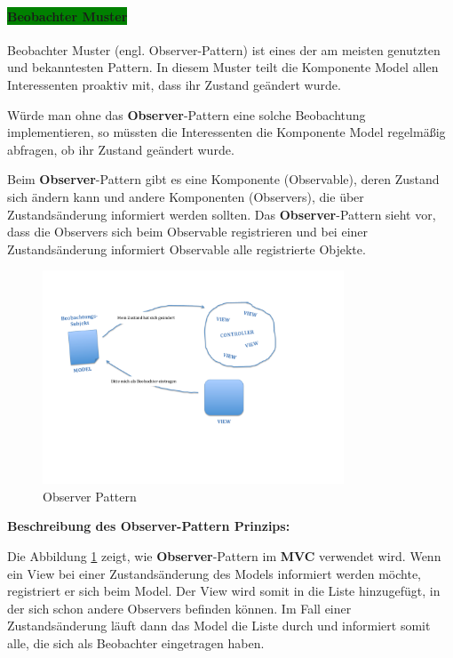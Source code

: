 \paragraph{\colorbox{green}{Beobachter Muster}}\label{observer}

Beobachter Muster (engl. Observer-Pattern) ist eines der am meisten genutzten und bekanntesten Pattern. In diesem Muster teilt die Komponente Model allen Interessenten proaktiv mit, dass ihr Zustand geändert wurde.

Würde man ohne das \textbf{Observer}-Pattern eine solche Beobachtung implementieren, so müssten die Interessenten die Komponente Model regelmäßig abfragen, ob ihr Zustand geändert wurde.

Beim \textbf{Observer}-Pattern gibt es eine Komponente (Observable), deren Zustand sich ändern kann und andere Komponenten (Observers), die über Zustandsänderung informiert werden sollten. Das \textbf{Observer}-Pattern sieht vor, dass die Observers sich beim Observable registrieren und bei einer Zustandsänderung informiert Observable alle registrierte Objekte.

\begin{figure}[H]
\centering
\includegraphics[trim = 0mm 0mm 0mm 0mm, clip, width=0.8\textwidth]{resources/observer}
\caption[Observer Pattern]{Observer Pattern}
\label{img:observer}
\end{figure}

\textbf{Beschreibung des \textbf{Observer}-Pattern Prinzips:}

Die Abbildung \ref{img:observer} zeigt, wie \textbf{Observer}-Pattern im \textbf{MVC} verwendet wird. Wenn ein View bei einer Zustandsänderung des Models informiert werden möchte, registriert er sich beim Model. Der View wird somit in die Liste hinzugefügt, in der sich schon andere Observers befinden können. Im Fall einer Zustandsänderung läuft dann das Model die Liste durch und informiert somit alle, die sich als Beobachter eingetragen haben.

